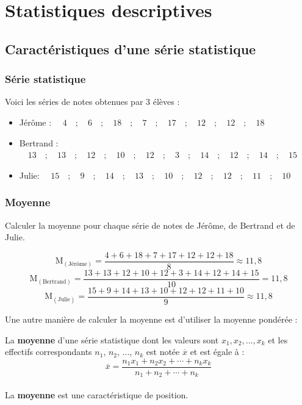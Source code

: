



\chapter{Statistiques descriptives}



\section{Caractéristiques d'une série statistique}

\subsection{Série statistique}
Voici les séries de notes obtenues par 3 élèves :
\begin{itemize}[label=\textbullet]
\item  Jérôme : $\quad 4 \quad; \quad 6 \quad; \quad 18 \quad; \quad 7 \quad; \quad 17 \quad ; \quad 12 \quad ; \quad 12 \quad ;\quad  18$
\item Bertrand : $\quad 13 \quad ; \quad 13\quad ; \quad 12 \quad ; \quad 10 \quad ; \quad 12 \quad ; \quad 3\quad ; \quad 14 \quad ; \quad 12 \quad ; \quad 14 \quad ; \quad 15$
\item  Julie: $\quad 15 \quad ; \quad 9 \quad ; \quad 14 \quad ; \quad 13 \quad ; \quad 10 \quad ; \quad 12 \quad ; \quad 12 \quad ; \quad 11 \quad ; \quad 10$
\end{itemize}

\subsection{Moyenne}

Calculer la moyenne pour chaque série de notes de Jérôme, de Bertrand et de Julie.

 $$\text{M}_{(\text{Jérôme})} =\dfrac{4+6+18+7+17+12+12+18}{8}\approx 11,8$$
 $$\text{M}_{(\text{Bertrand})} =\dfrac{13+13+12+10+12+3+14+12+14+15}{10}=11,8 $$
 $$\text{M}_{(\text{Julie})} =\dfrac{15+9+14+13+10+12+12+11+10}{9}\approx 11,8$$


Une autre manière de calculer la moyenne est d'utiliser la moyenne pondérée : 

\begin{Définition}

La {\bf{moyenne}} d'une série statistique dont les valeurs sont $x_1, x_2 , ..., x_k$ et les effectifs correspondants $n_1$, $n_2$, ..., $n_k$ est notée $\overline{x}$ et est égale à : $$ \overline{x} = \dfrac{n_1x_1 + n_2x_2 + \cdots +n_kx_k}{n_1+n_2+\cdots +n_k}$$\\
La {\bf{moyenne}} est une caractéristique de position.
\end{Définition} 

